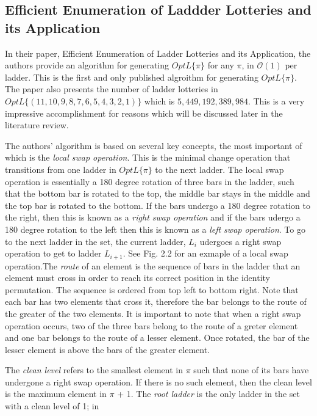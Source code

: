 \subsection{Efficient Enumeration of Laddder Lotteries and its Application}
In their paper, Efficient Enumeration of Ladder Lotteries and its Application,
the authors provide an algorithm for generating $OptL\{\pi\}$ 
for any $\pi$, in $\mathcal{O}(1)$ per ladder. This is the first and only 
published algroithm for generating $OptL\{\pi\}$. The paper also presents the number 
of ladder lotteries in $OptL\{(11, 10, 9, 8, 7, 6, 5, 4, 3, 2, 1)\}$ which is 
$5,449,192,389,984$. This is a very impressive accomplishment for reasons which 
will be discussed later in the literature review.\par 
The authors' algorithm is based on several key concepts, the most 
important of which is the \emph{local swap operation}. This is the 
minimal change operation that transitions from one ladder in $OptL\{\pi\}$ to the 
next ladder. The local swap operation is essentially a 180 degree rotation
of three bars in the ladder, such that the bottom
bar is rotated to the top, the middle bar stays in the middle and the top bar
is rotated to the bottom. If the bars undergo a 180 degree rotation to the right, 
then this is known as a \emph{right swap operation} and 
if the bars udergo a 180 degree rotation to the left then this 
is known as a \emph{left swap operation}. To go to the next ladder in the set, 
the current ladder, $L_{i}$ udergoes a right swap operation 
to get to ladder $L_{i+1}$. See Fig. 2.2 for an exmaple of a 
local swap operation.The \emph{route} of an element is the sequence of bars in the ladder that an element must cross in order to reach its correct position in 
the identity permutation. The sequence is ordered from top left to bottom right.
Note that each bar has two elements that cross it, 
therefore the bar belongs to the route of the greater of the two elements. 
It is important to note that when a right swap operation occurs, 
two of the three bars belong to the route of a greter element and one bar belongs
to the route of a lesser element. Once rotated, the bar of the lesser element is 
above the bars of the greater element.\par
The \emph{clean level} refers to the smallest element 
in $\pi$ such that none of its bars have undergone a right swap operation.
If there is no such element, then the clean level is the maximum element in $\pi$ + 1.
The \emph{root ladder} is the only ladder in  the set with a clean level of 1; in 
